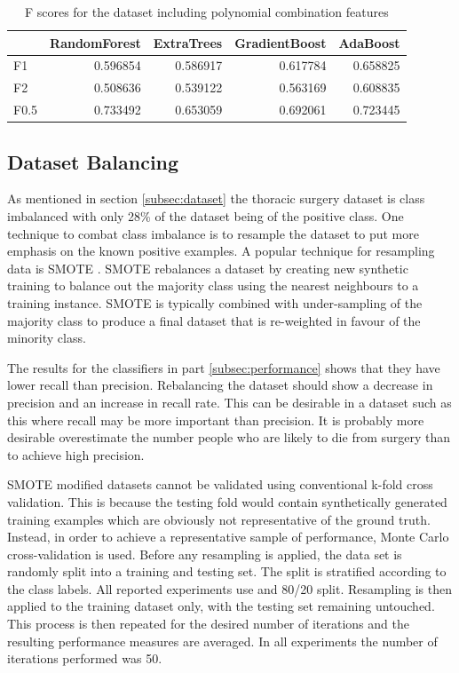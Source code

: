 \documentclass[journal]{IEEEtran}
\begin{document}
\begin{table}
\caption{F scores for the dataset including polynomial combination features}

\begin{tabular}{lrrrr}
{} &  RandomForest &  ExtraTrees &  GradientBoost &  AdaBoost \\
\hline
F1   &      0.596854 &    0.586917 &       0.617784 &  0.658825 \\
F2   &      0.508636 &    0.539122 &       0.563169 &  0.608835 \\
F0.5 &      0.733492 &    0.653059 &       0.692061 &  0.723445 \\
\end{tabular}

\label{table:f-scores-poly}	
\end{table}

\subsection{Dataset Balancing}
\label{subsec:dataset-balancing}
As mentioned in section \ref{subsec:dataset} the thoracic surgery dataset is class imbalanced with only 28\% of the dataset being of the positive class. One technique to combat class imbalance is to resample the dataset to put more emphasis on the known positive examples. A popular technique for resampling data is SMOTE \cite{chawla2002smote}. SMOTE rebalances a dataset by creating new synthetic training to balance out the majority class using the nearest neighbours to a training instance. SMOTE is typically combined with under-sampling of the majority class to produce a final dataset that is re-weighted in favour of the minority class. 

The results for the classifiers in part \ref{subsec:performance} shows that they have lower recall than precision. Rebalancing the dataset should show a decrease in precision and an increase in recall rate. This can be desirable in a dataset such as this where recall may be more important than precision. It is probably more desirable overestimate the number people who are likely to die from surgery than to achieve high precision.

SMOTE modified datasets cannot be validated using conventional k-fold cross validation. This is because the testing fold would contain synthetically generated training examples which are obviously not representative of the ground truth. Instead, in order to achieve a representative sample of performance, Monte Carlo cross-validation \cite{dubitzky2007fundamentals} is used. Before any resampling is applied, the data set is randomly split into a training and testing set. The split is stratified according to the class labels. All reported experiments use and 80/20 split. Resampling is then applied to the training dataset only, with the testing set remaining untouched. This process is then repeated for the desired number of iterations and the resulting performance measures are averaged. In all experiments the number of iterations performed was 50.  
\end{document}
